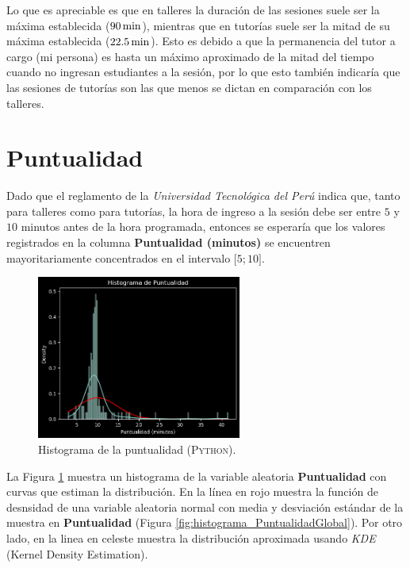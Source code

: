 \documentclass[11pt,a4paper]{book}
\theoremstyle{definition}%
\begin{document}
            Lo que es apreciable es que en talleres la duración de las sesiones suele ser la máxima establecida ($90\,\textup{min}$), mientras que en tutorías suele ser la mitad de su máxima establecida ($22.5\,\textup{min}$). Esto es debido a que la permanencia del tutor a cargo (mi persona) es hasta un máximo aproximado de la mitad del tiempo cuando no ingresan estudiantes a la sesión, por lo que esto también indicaría que las sesiones de tutorías son las que menos se dictan en comparación con los talleres.
        \section{Puntualidad}
            Dado que el reglamento de la \textit{Universidad Tecnológica del Perú} indica que, tanto para talleres como para tutorías, la hora de ingreso a la sesión debe ser entre $5$ y $10$ minutos antes de la hora programada, entonces se esperaría que los valores registrados en la columna \textbf{Puntualidad (minutos)} se encuentren mayoritariamente concentrados en el intervalo $\mathopen[5;10\mathclose]$.            
            \begin{figure}[H]
                \centering
                \includegraphics[width=0.6\textwidth]{Sources/histogram_Puntualidad.png}
                \caption{Histograma de la puntualidad (\textsc{Python}).}
                \label{fig:histogram_Puntualidad}
            \end{figure}
            La Figura \ref{fig:histogram_Puntualidad} muestra un histograma de la variable aleatoria \textbf{Puntualidad} con curvas que estiman la distribución. En la línea en rojo muestra la función de desnsidad de una variable aleatoria normal con media y desviación estándar de la muestra en \textbf{Puntualidad} (Figura \ref{fig:histograma_PuntualidadGlobal}). Por otro lado, en la linea en celeste muestra la distribución aproximada usando \textit{KDE} (Kernel Density Estimation).
\end{document}
